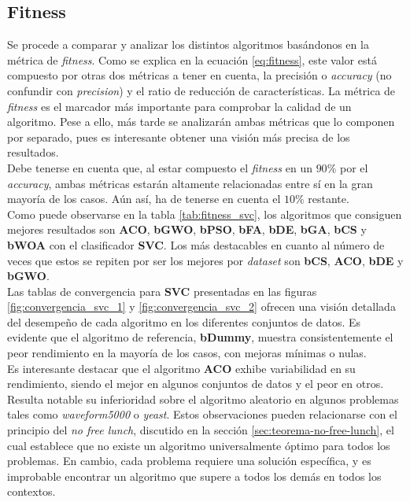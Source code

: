 \subsection{Fitness}
Se procede a comparar y analizar los distintos algoritmos basándonos en la métrica de \textit{fitness}. Como se explica en la ecuación \ref{eq:fitness}, este valor está compuesto por otras dos métricas a tener en cuenta, la precisión o \textit{accuracy} (no confundir con \textit{precision}) y el ratio de reducción de características. La métrica de \textit{fitness} es el marcador más importante para comprobar la calidad de un algoritmo. Pese a ello, más tarde se analizarán ambas métricas que lo componen por separado, pues es interesante obtener una visión más precisa de los resultados.\\[6pt]
Debe tenerse en cuenta que, al estar compuesto el \textit{fitness} en un $90\%$ por el \textit{accuracy}, ambas métricas estarán altamente relacionadas entre sí en la gran mayoría de los casos. Aún así, ha de tenerse en cuenta el $10\%$ restante.\\[6pt]
Como puede observarse en la tabla \ref{tab:fitness_svc}, los algoritmos que consiguen mejores resultados son \textbf{ACO}, \textbf{bGWO}, \textbf{bPSO}, \textbf{bFA}, \textbf{bDE}, \textbf{bGA}, \textbf{bCS} y \textbf{bWOA} con el clasificador \textbf{SVC}. Los más destacables en cuanto al número de veces que estos se repiten por ser los mejores por \textit{dataset} son \textbf{bCS}, \textbf{ACO}, \textbf{bDE} y \textbf{bGWO}.\\[6pt]

Las tablas de convergencia para \textbf{SVC} presentadas en las figuras \ref{fig:convergencia_svc_1} y \ref{fig:convergencia_svc_2} ofrecen una visión detallada del desempeño de cada algoritmo en los diferentes conjuntos de datos. Es evidente que el algoritmo de referencia, \textbf{bDummy}, muestra consistentemente el peor rendimiento en la mayoría de los casos, con mejoras mínimas o nulas.\\[6pt]
Es interesante destacar que el algoritmo \textbf{ACO} exhibe variabilidad en su rendimiento, siendo el mejor en algunos conjuntos de datos y el peor en otros. Resulta notable su inferioridad sobre el algoritmo aleatorio en algunos problemas tales como \textit{waveform5000} o \textit{yeast}. Estos observaciones pueden relacionarse con el principio del \textit{no free lunch}, discutido en la sección \ref{sec:teorema-no-free-lunch}, el cual establece que no existe un algoritmo universalmente óptimo para todos los problemas. En cambio, cada problema requiere una solución específica, y es improbable encontrar un algoritmo que supere a todos los demás en todos los contextos.

